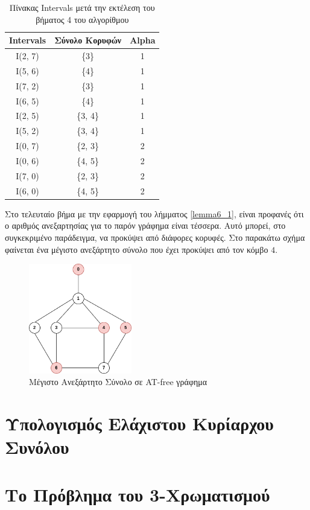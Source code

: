 \begin{table}[H]
	\centering
	\caption{Πίνακας Intervals μετά την εκτέλεση του βήματος 4 του αλγορίθμου}
	\begin{tabular}{|c|c|c|}
		\hline
		\textbf{Intervals} & \textbf{Σύνολο Κορυφών} & \textbf{Alpha} \\
		\hline
		I(2, 7) & \{3\} & 1 \\
		I(5, 6) & \{4\} & 1 \\
		I(7, 2) & \{3\} & 1 \\
		I(6, 5) & \{4\} & 1 \\
		I(2, 5) & \{3, 4\} & 1 \\
		I(5, 2) & \{3, 4\} & 1 \\
		I(0, 7) & \{2, 3\} & 2 \\
		I(0, 6) & \{4, 5\} & 2 \\
		I(7, 0) & \{2, 3\} & 2 \\
		I(6, 0) & \{4, 5\} & 2 \\
		\hline
	\end{tabular}
	\label{table:computed-alpha-intervals}
\end{table}

Στο τελευταίο βήμα με την εφαρμογή του λήμματος \ref{lemma6_1}, είναι προφανές ότι ο αριθμός ανεξαρτησίας για το παρόν γράφημα είναι τέσσερα. Αυτό μπορεί, στο συγκεκριμένο παράδειγμα, να προκύψει από διάφορες κορυφές. Στο παρακάτω  σχήμα φαίνεται ένα μέγιστο ανεξάρτητο σύνολο που έχει προκύψει από τον κόμβο $4$.


\begin{figure}[H]
	\centering
	\includegraphics[width=0.4\textwidth]{pictures/at-free-graph.intependent-set.png} 
	\caption{Μέγιστο Ανεξάρτητο Σύνολο σε AT-free γράφημα}
	\label{fig:at-free-graph-independent-set}
\end{figure}


\section{Υπολογισμός Ελάχιστου Κυρίαρχου Συνόλου}
\label{sec:Domination_Set_Alg}


\section{Το Πρόβλημα του 3-Χρωματισμού}
\label{sec:3-Coloring_Alg}

 








